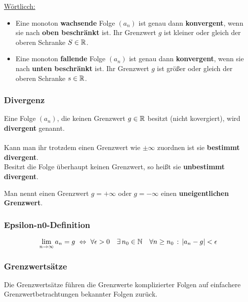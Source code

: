 	\underline{Wörtlicch:}
\begin{itemize}
\item Eine monoton \textbf{wachsende} Folge $(a_n)$ ist genau dann \textbf{konvergent}, wenn sie nach \textbf{oben beschränkt} ist. Ihr Grenzwert $g$ ist kleiner oder gleich der oberen Schranke $S\in\mathbb{R}$.
\item  Eine monoton \textbf{fallende} Folge $(a_n)$ ist genau dann \textbf{konvergent}, wenn sie nach \textbf{unten beschränkt} ist. Ihr Grenzwert $g$ ist größer oder gleich der oberen Schranke $s\in\mathbb{R}$.
\end{itemize}

\subsubsection{Divergenz}
\begin{Definition}
Eine Folge $(a_n)$, die keinen Grenzwert $g\in\mathbb{R}$ besitzt (nicht kovergiert), wird \textbf{divergent} genannt.\\\\
Kann man ihr trotzdem einen Grenzwert wie $\pm\infty$ zuordnen ist sie \textbf{bestimmt divergent}.\\
Besitzt die Folge überhaupt keinen Grenzwert, so heißt sie \textbf{unbestimmt divergent}.
\end{Definition}

\begin{Bemerkung}
Man nennt einen Grenzwert $g=+\infty$ oder $g=-\infty$ einen \textbf{uneigentlichen Grenzwert}.
\end{Bemerkung}


\subsubsection{Epsilon-n0-Definition}
\begin{Definition}
$$\lim\limits_{n\to\infty}a_n=g \ \Leftrightarrow\ \forall  \epsilon > 0\quad \exists\, n_0 \in\N \quad \forall n\geq n_0\,:\, |a_n-g|<\epsilon$$
\end{Definition}
\subsubsection{Grenzwertsätze}


Die Grenzwertsätze führen die Grenzwerte komplizierter Folgen auf einfachere Grenzwertbetrachtungen bekannter Folgen zurück.\\
\begin{Theorem}
\end{Theorem}
